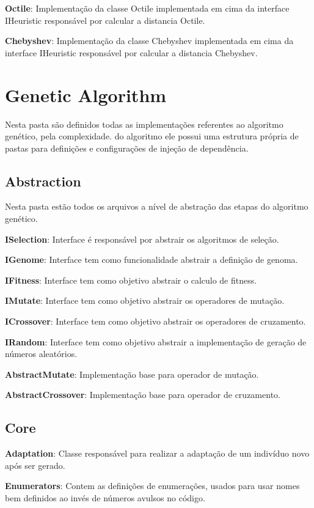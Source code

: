 \textbf{Octile}: Implementação da classe Octile implementada em cima da interface IHeuristic responsável por calcular a distancia Octile.

\textbf{Chebyshev}: Implementação da classe Chebyshev implementada em cima da interface IHeuristic responsável por calcular a distancia Chebyshev.

\section{Genetic Algorithm}

Nesta pasta são definidos todas as implementações referentes ao algoritmo genético, pela complexidade.
do algoritmo ele possui uma estrutura própria de pastas para definições e configurações de injeção de dependência.

\subsection{Abstraction}

Nesta pasta estão todos os arquivos a nível de abstração das etapas do algoritmo genético.

\textbf{ISelection}: Interface é responsável por abstrair os algoritmos de seleção.

\textbf{IGenome}: Interface tem como funcionalidade abstrair a definição de genoma.

\textbf{IFitness}: Interface tem como objetivo abstrair o calculo de fitness.

\textbf{IMutate}: Interface tem como objetivo abstrair os operadores de mutação.

\textbf{ICrossover}:  Interface tem como objetivo abstrair os operadores de cruzamento.

\textbf{IRandom}: Interface tem como objetivo abstrair a implementação de geração de números aleatórios.

\textbf{AbstractMutate}: Implementação base para operador de mutação.

\textbf{AbstractCrossover}: Implementação base para operador de cruzamento.

\subsection{Core}

\textbf{Adaptation}: Classe responsável para realizar a adaptação de um indivíduo novo após ser gerado.

\textbf{Enumerators}: Contem as definições de enumerações, usados para usar nomes bem definidos ao invés de números avulsos no código.

